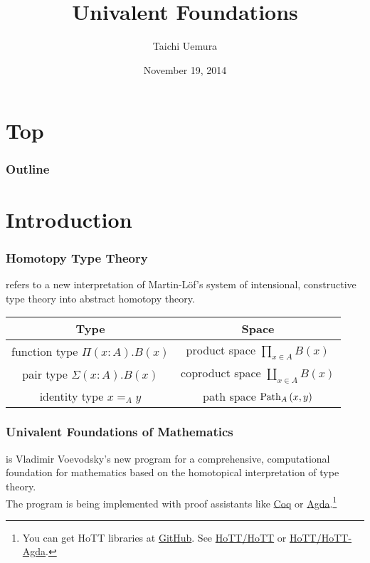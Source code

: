 \documentclass[dvipdfmx]{beamer}
\title{Univalent Foundations}
\author{Taichi Uemura}
\institute[KURIMS]{\url{uemura@kurims.kyoto-u.ac.jp}
    \\
    Research Institute for Mathematical Science,
    Kyoto University
  }
\date{November 19, 2014}
\begin{document}
\section{Top}

\begin{frame}
  \titlepage
\end{frame}

\begin{frame}
  \frametitle{Outline}
  \tableofcontents
\end{frame}

\section{Introduction}

\begin{frame}
  \frametitle{Homotopy Type Theory}
  refers to a new interpretation of Martin-L\"of's system of
  intensional, constructive type theory into
  abstract homotopy theory.\cite{hottbook}

  \begin{center}
    \begin{tabular}{c|c}
      \hline
      Type & Space \\
      \hline
      function type
      $\Pi \left( x : A \right) . B \left( x \right)$
      & product space
      $\prod _{x \in A} B \left( x \right)$ \\
      pair type
      $\Sigma \left( x : A \right) . B \left( x \right)$
      & coproduct space
      $\coprod _{x \in A} B \left( x \right)$ \\
      identity type
      $x =_{A} y$
      & path space
      ${\rm Path}_A\left( x , y \right)$ \\
      \hline
    \end{tabular}
  \end{center}
\end{frame}

\begin{frame}
  \frametitle{Univalent Foundations of Mathematics}
  is Vladimir Voevodsky's new program
  for a comprehensive, computational foundation for mathematics
  based on the homotopical interpretation of type theory.
  \\
  The program is being implemented with proof assistants
  like \href{https://coq.inria.fr/}{Coq}
  or \href{http://wiki.portal.chalmers.se/agda/pmwiki.php}{Agda}.\footnote{
    You can get HoTT libraries at \href{https://github.com/}{GitHub}.
    See \href{https://github.com/HoTT/HoTT}{HoTT/HoTT}
    or \href{https://github.com/HoTT/HoTT-Agda}{HoTT/HoTT-Agda}.
  }
\end{frame}
\end{document}
